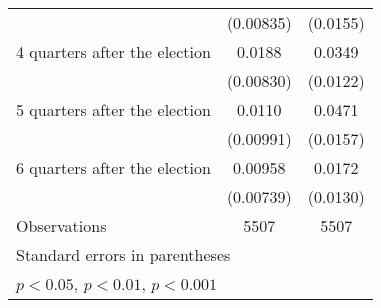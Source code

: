 \begin{table}[htbp]
\begin{tabular}{l*{2}{c}}
                    &   (0.00835)         &    (0.0155)         \\
[1em]
 4 quarters after the election&      0.0188\sym{*}  &      0.0349\sym{**} \\
                    &   (0.00830)         &    (0.0122)         \\
[1em]
 5 quarters after the election&      0.0110         &      0.0471\sym{**} \\
                    &   (0.00991)         &    (0.0157)         \\
[1em]
 6 quarters after the election&     0.00958         &      0.0172         \\
                    &   (0.00739)         &    (0.0130)         \\
\hline
Observations        &        5507         &        5507         \\
\hline\hline
\multicolumn{3}{l}{\footnotesize Standard errors in parentheses}\\
\multicolumn{3}{l}{\footnotesize \sym{*} \(p<0.05\), \sym{**} \(p<0.01\), \sym{***} \(p<0.001\)}\\
\end{tabular}
\end{table}
